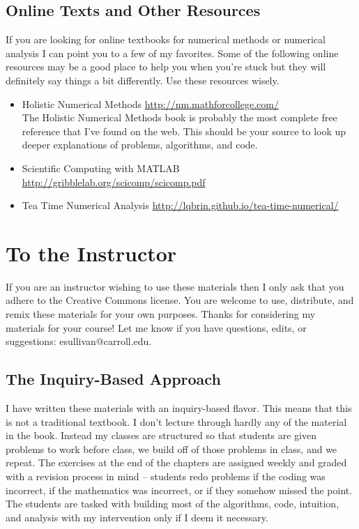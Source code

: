 \subsection{Online Texts and Other Resources}\label{pref:resources}
If you are looking for online textbooks for numerical methods or numerical analysis I can
point you to a few of my favorites.  Some of the following online resources may be a good
place to help you when you're stuck but they will definitely say things a bit differently.
Use these resources wisely.
\begin{itemize}
    \item Holistic Numerical Methods
        \href{http://nm.mathforcollege.com/}{http://nm.mathforcollege.com/}\\
        The Holistic Numerical Methods book is probably the most complete free reference
        that I've found on the web.  This should be your source to look up deeper
        explanations of problems, algorithms, and code.
    \item Scientific Computing with MATLAB
        \href{http://gribblelab.org/scicomp/scicomp.pdf}{http://gribblelab.org/scicomp/scicomp.pdf}
    \item Tea Time Numerical Analysis
        \href{http://lqbrin.github.io/tea-time-numerical/}{http://lqbrin.github.io/tea-time-numerical/}
\end{itemize}


\section{To the Instructor}
If you are an instructor wishing to use these materials then I only ask that you adhere to the
Creative Commons license.  You are welcome to use, distribute, and remix these materials
for your own purposes.  Thanks for considering my materials for your course!  Let me know
if you have questions, edits, or suggestions: esullivan@carroll.edu.

\subsection{The Inquiry-Based Approach}
I have written these materials with an inquiry-based flavor.  This means that this is not
a traditional textbook.  I don't
lecture through hardly any of the material in the book.  Instead my classes are structured
so that students are given problems to work before class, we build off of those problems
in class, and we repeat.  The exercises at the end of the chapters are assigned weekly and
graded with a revision process in mind -- students redo problems if the coding was
incorrect, if the mathematics was incorrect, or if they somehow missed the point.  The
students are tasked with building most of the algorithms, code, intuition, and analysis
with my intervention only if I deem it necessary. 

